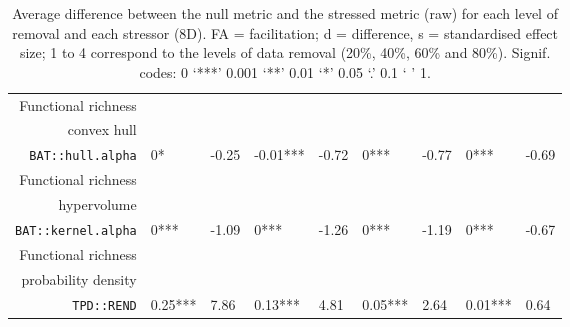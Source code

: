 \begin{table}[ht]
\begin{tabular}{rllllllll}
  Functional richness\\convex hull\\\texttt{BAT::hull.alpha} & 0* & -0.25 & -0.01*** & -0.72 & 0*** & -0.77 & 0*** & -0.69 \\ 
  Functional richness\\hypervolume\\\texttt{BAT::kernel.alpha} & 0*** & -1.09 & 0*** & -1.26 & 0*** & -1.19 & 0*** & -0.67 \\ 
  Functional richness\\probability density\\\texttt{TPD::REND} & 0.25*** & 7.86 & 0.13*** & 4.81 & 0.05*** & 2.64 & 0.01*** & 0.64 \\ 
   \hline
\end{tabular}
\caption{Average difference between the null metric and the stressed metric (raw) for each level of removal and each stressor (8D). FA = facilitation; d = difference, s = standardised effect size; 1 to 4 correspond to the levels of data removal (20\%, 40\%, 60\% and 80\%). Signif. codes:  0 ‘***’ 0.001 ‘**’ 0.01 ‘*’ 0.05 ‘.’ 0.1 ‘ ’ 1.} 
\end{table}
